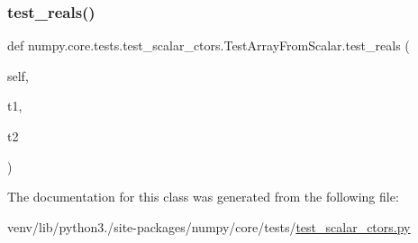 \subsubsection{\texorpdfstring{test\+\_\+reals()}{test\_reals()}}
{\footnotesize\ttfamily def numpy.\+core.\+tests.\+test\+\_\+scalar\+\_\+ctors.\+Test\+Array\+From\+Scalar.\+test\+\_\+reals (\begin{DoxyParamCaption}\item[{}]{self,  }\item[{}]{t1,  }\item[{}]{t2 }\end{DoxyParamCaption})}



The documentation for this class was generated from the following file\+:\begin{DoxyCompactItemize}
\item 
venv/lib/python3./site-\/packages/numpy/core/tests/\hyperlink{test__scalar__ctors_8py}{test\+\_\+scalar\+\_\+ctors.\+py}\end{DoxyCompactItemize}
